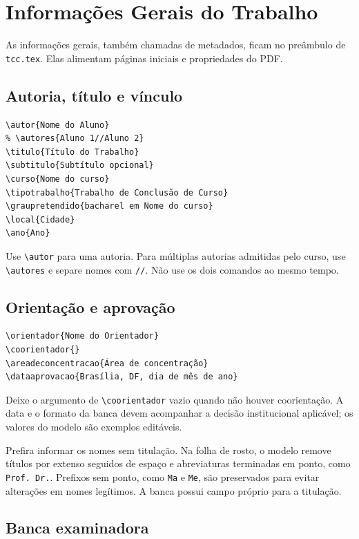 \chapter{Informações Gerais do Trabalho}

As informações gerais, também chamadas de metadados, ficam no preâmbulo de \texttt{tcc.tex}. Elas alimentam páginas iniciais e propriedades do PDF.

\section{Autoria, título e vínculo}

\begin{lstlisting}
\autor{Nome do Aluno}
% \autores{Aluno 1//Aluno 2}
\titulo{Título do Trabalho}
\subtitulo{Subtítulo opcional}
\curso{Nome do curso}
\tipotrabalho{Trabalho de Conclusão de Curso}
\graupretendido{bacharel em Nome do curso}
\local{Cidade}
\ano{Ano}
\end{lstlisting}

Use \texttt{\textbackslash autor} para uma autoria. Para múltiplas autorias admitidas pelo curso, use \texttt{\textbackslash autores} e separe nomes com \texttt{//}. Não use os dois comandos ao mesmo tempo.

\section{Orientação e aprovação}

\begin{lstlisting}
\orientador{Nome do Orientador}
\coorientador{}
\areadeconcentracao{Área de concentração}
\dataaprovacao{Brasília, DF, dia de mês de ano}
\end{lstlisting}

Deixe o argumento de \texttt{\textbackslash coorientador} vazio quando não houver coorientação. A data e o formato da banca devem acompanhar a decisão institucional aplicável; os valores do modelo são exemplos editáveis.

Prefira informar os nomes sem titulação. Na folha de rosto, o modelo remove
títulos por extenso seguidos de espaço e abreviaturas terminadas em ponto,
como \texttt{Prof. Dr.}. Prefixos sem ponto, como \texttt{Ma} e \texttt{Me},
são preservados para evitar alterações em nomes legítimos. A banca possui
campo próprio para a titulação.

\section{Banca examinadora}

